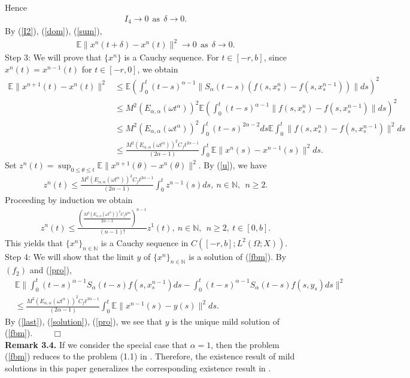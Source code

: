 \documentclass[12pt,a4paper,oneside,reqno,notitlepage]{amsart}
\theoremstyle{plain}
\numberwithin{equation}{section}
\begin{document}
Hence
\begin{align}\label{sum}
I_{4}\rightarrow 0 \ \ \mbox{as} \ \ \delta\rightarrow 0.
\end{align}
By (\ref{I2}), (\ref{dom}), (\ref{sum}),
\begin{align*}
\mathbb{E}\|x^{n}(t+\delta)-x^{n}(t)\|^{2}\rightarrow 0 \ \ \mbox{as} \ \ \delta\rightarrow 0.
\end{align*}
Step 3: We will prove that $\{x^{n}\}$ is a Cauchy sequence. For $t\in[-r,b]$, since $x^{n}(t)=x^{n-1}(t)$  for $t\in[-r,0]$, we obtain
\begin{align}\label{u}
\mathbb{E}\|x^{n+1}(t)-x^{n}(t)\|^{2}&\leq\mathbb{E}\left(\int_{0}^{t}(t-s)^{\alpha-1}\|S_{\alpha}(t-s)(f(s,x_{s}^{n})-f(s,x_{s}^{n-1}))\|ds\right)^{2}\nonumber\\
&\leq M^{2}(E_{\alpha,\alpha}(\omega t^{\alpha}))^{2} \mathbb{E}\left(\int_{0}^{t}(t-s)^{\alpha-1}\|f(s,x_{s}^{n})-f(s,x_{s}^{n-1})\|ds\right)^{2}\nonumber\\
&\leq M^{2}(E_{\alpha,\alpha}(\omega t^{\alpha}))^{2}\int_{0}^{t}(t-s)^{2\alpha-2}ds\mathbb{E}\int_{0}^{t}\|f(s,x_{s}^{n})-f(s,x_{s}^{n-1})\|^{2}ds\nonumber\\
&\leq\frac{M^{2}(E_{\alpha,\alpha}(\omega t^{\alpha}))^{2}C_{f}t^{2\alpha-1}}{(2\alpha-1)}\int_{0}^{t}\mathbb{E}\|x^{n}(s)-x^{n-1}(s)\|^{2}ds.
\end{align}
Set $z^{n}(t)=\sup_{0\leq \theta\leq t}\mathbb{E}\|x^{n+1}(\theta)-x^{n}(\theta)\|^{2}$. By (\ref{u}), we have
\begin{align*}
z^{n}(t)\leq \frac{M^{2}(E_{\alpha,\alpha}(\omega t^{\alpha}))^{2}C_{f}t^{2\alpha-1}}{(2\alpha-1)}\int_{0}^{t}z^{n-1}(s)ds,\ n\in\mathbb{N},\ \ n\geq2.
\end{align*}
Proceeding by induction we obtain
\begin{align*}
z^{n}(t)\leq \frac{(\frac{M^{2}(E_{\alpha,\alpha}(\omega t^{\alpha}))^{2}C_{f}b^{2\alpha}}{2\alpha-1})^{n-1}}{(n-1)!}z^{1}(t),\  n\in\mathbb{N},\ \ n\geq2, \ t \in [0,b].
\end{align*}
This yields that $\{x^{n}\}_{n\in \mathbb{N}}$ is a Cauchy sequence in $C([-r,b];L^{2}(\Omega;X))$.\\
Step 4: We will show that the limit $y$ of $\{x^{n}\}_{n\in \mathbb{N}}$ is a solution of (\ref{fbm}). By $(f_{2})$ and (\ref{pro}),
\begin{align}\label{last}
&\mathbb{E}\|\int_{0}^{t}(t-s)^{\alpha-1}S_{\alpha}(t-s)f(s,x_{s}^{n-1})ds-\int_{0}^{t}(t-s)^{\alpha-1}S_{\alpha}(t-s)f(s,y_{s})ds\|^{2}\nonumber\\
&\leq \frac{M^{2}(E_{\alpha,\alpha}(\omega t^{\alpha}))^{2}C_{f}t^{2\alpha-1}}{(2\alpha-1)}\int_{0}^{t}\mathbb{E}\|x^{n-1}(s)-y(s)\|^{2}ds.
\end{align}
By (\ref{last}), (\ref{solution}), (\ref{pro}), we see that $y$ is the unique mild solution of (\ref{fbm}).  \ \ \ \ $\Box$\\
\textbf{Remark 3.4.} If we consider the special case that $\alpha=1$, then the problem (\ref{fbm}) reduces to the problem (1.1) in \cite{Caraballo}. Therefore, the existence result of mild solutions in this paper generalizes the corresponding existence result in \cite{Caraballo}.
\end{document}
